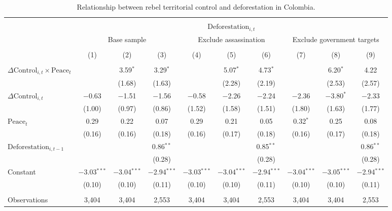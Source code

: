 
\begin{table}[!htbp] \centering 
  \caption{Relationship between rebel territorial control and deforestation in Colombia.} 
  \label{tab:deforest_robust} 
\footnotesize 
\begin{tabular}{@{\extracolsep{-6pt}}lccccccccc} 
\\[-1.8ex]\hline 
\hline \\[-1.8ex] 
 & \multicolumn{9}{c}{$\text{Deforestation}_{i,t}$} \\ 
\cline{2-10} 
 & \multicolumn{3}{c}{Base sample} & \multicolumn{3}{c}{Exclude assassination} & \multicolumn{3}{c}{Exclude government targets} \\ 
\\[-1.8ex] & (1) & (2) & (3) & (4) & (5) & (6) & (7) & (8) & (9)\\ 
\hline \\[-1.8ex] 
 $\Delta\text{Control}_{i,t} \times \text{Peace}_{t}$ &  & 3.59$^{*}$ & 3.29$^{*}$ &  & 5.07$^{*}$ & 4.73$^{*}$ &  & 6.20$^{*}$ & 4.22 \\ 
  &  & (1.68) & (1.63) &  & (2.28) & (2.19) &  & (2.53) & (2.57) \\ 
  $\Delta\text{Control}_{i,t}$ & $-$0.63 & $-$1.51 & $-$1.56 & $-$0.58 & $-$2.26 & $-$2.24 & $-$2.36 & $-$3.80$^{*}$ & $-$2.33 \\ 
  & (1.00) & (0.97) & (0.86) & (1.52) & (1.58) & (1.51) & (1.80) & (1.63) & (1.77) \\ 
  $\text{Peace}_{t}$ & 0.29 & 0.22 & 0.07 & 0.29 & 0.21 & 0.05 & 0.32$^{*}$ & 0.25 & 0.08 \\ 
  & (0.16) & (0.16) & (0.18) & (0.16) & (0.17) & (0.18) & (0.16) & (0.17) & (0.18) \\ 
  $\text{Deforestation}_{i,t-1}$ &  &  & 0.86$^{**}$ &  &  & 0.85$^{**}$ &  &  & 0.86$^{**}$ \\ 
  &  &  & (0.28) &  &  & (0.28) &  &  & (0.28) \\ 
  Constant & $-$3.03$^{***}$ & $-$3.04$^{***}$ & $-$2.94$^{***}$ & $-$3.03$^{***}$ & $-$3.04$^{***}$ & $-$2.94$^{***}$ & $-$3.04$^{***}$ & $-$3.05$^{***}$ & $-$2.94$^{***}$ \\ 
  & (0.10) & (0.10) & (0.11) & (0.10) & (0.10) & (0.11) & (0.10) & (0.10) & (0.11) \\ 
 \hline \\[-1.8ex] 
Observations & 3,404 & 3,404 & 2,553 & 3,404 & 3,404 & 2,553 & 3,404 & 3,404 & 2,553 \\ 

\end{tabular}
\end{table}
